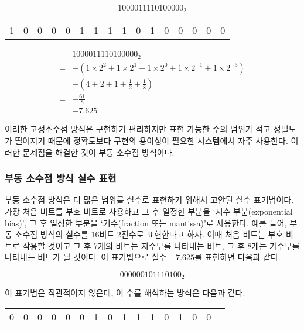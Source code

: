 \documentclass{article}
\begin{document}
$$
1 0000111 10100000_2
$$

\begin{center}
    \begin{tabular}{c|ccccccc|cccccccc}
        1 & 0 & 0 & 0 & 0 & 1 & 1 & 1 & 1 & 0 & 1 & 0 & 0 & 0 & 0 & 0
    \end{tabular}
\end{center}

$$
\begin{aligned}
    & 1000011110100000_2 \\
    =& -\left(1 \times 2^2 + 1 \times 2^1 + 1 \times 2^0 + 1 \times 2^{-1} + 1 \times 2^{-3}\right) \\
    =& -\left(4 + 2 + 1 + \frac{1}{2} + \frac{1}{8}\right) \\
    =& -\frac{61}{8} \\
    =& -7.625
\end{aligned}
$$

이러한 고정소수점 방식은 구현하기 편리하지만 표현 가능한 수의 범위가 적고 정밀도가 떨어지기
때문에 정확도보다 구현의 용이성이 필요한 시스템에서 자주 사용한다.
이러한 문제점을 해결한 것이 부동 소수점 방식이다.

\subsubsection{부동 소수점 방식 실수 표현}

부동 소수점 방식은 더 많은 범위를 실수로 표현하기 위해서 고안된 실수 표기법이다.
가장 처음 비트를 부호 비트로 사용하고 그 후 일정한 부분을 `지수 부분(exponential bias)',
그 후 일정한 부분을 `기수(fraction 또는 mantissa)'로 사용한다.
예를 들어, 부동 소수점 방식의 실수를 16비트 2진수로 표현한다고 하자.
이때 처음 비트는 부호 비트로 작용할 것이고 그 후 7개의 비트는 지수부를 나타내는 비트,
그 후 8개는 가수부를 나타내는 비트가 될 것이다.
이 표기법으로 실수 $-7.625$를 표현하면 다음과 같다.

$$
0 0000010 1110100_2
$$

이 표기법은 직관적이지 않은데, 이 수를 해석하는 방식은 다음과 같다.

\begin{center}
    \begin{tabular}{c|ccccccc|cccccccc}
        0 & 0 & 0 & 0 & 0 & 0 & 1 & 0 & 1 & 1 & 1 & 0 & 1 & 0 & 0
    \end{tabular}
\end{center}
\end{document}
